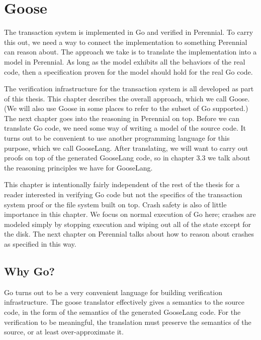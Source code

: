 \hypertarget{goose}{%
\section{Goose}\label{goose}}

The transaction system is implemented in Go and verified in Perennial.
To carry this out, we need a way to connect the implementation to
something Perennial can reason about. The approach we take is to
translate the implementation into a model in Perennial. As long as the
model exhibits all the behaviors of the real code, then a specification
proven for the model should hold for the real Go code.

The verification infrastructure for the transaction system is all
developed as part of this thesis. This chapter describes the overall
approach, which we call Goose. (We will also use Goose in some places to
refer to the subset of Go supported.) The next chapter goes into the
reasoning in Perennial on top. Before we can translate Go code, we need
some way of writing a model of the source code. It turns out to be
convenient to use another programming language for this purpose, which
we call GooseLang. After translating, we will want to carry out proofs
on top of the generated GooseLang code, so in chapter 3.3 we talk about
the reasoning principles we have for GooseLang.

This chapter is intentionally fairly independent of the rest of the
thesis for a reader interested in verifying Go code but not the
specifics of the transaction system proof or the file system built on
top. Crash safety is also of little importance in this chapter. We focus
on normal execution of Go here; crashes are modeled simply by stopping
execution and wiping out all of the state except for the disk. The next
chapter on Perennial talks about how to reason about crashes as
specified in this way.

\hypertarget{why-go}{%
\subsection{Why Go?}\label{why-go}}

Go turns out to be a very convenient language for building verification
infrastructure. The goose translator effectively gives a semantics to
the source code, in the form of the semantics of the generated GooseLang
code. For the verification to be meaningful, the translation must
preserve the semantics of the source, or at least over-approximate it.


